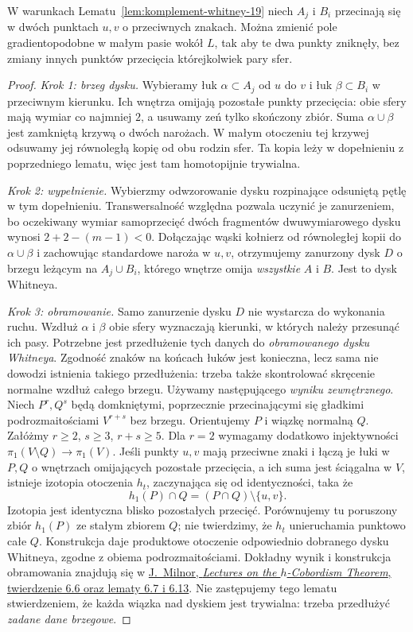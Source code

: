 \begin{lemat}
\label{lem:whitney-hc-19}
W warunkach
Lematu~\ref{lem:komplement-whitney-19}
niech $A_j$ i $B_i$
przecinają się w dwóch
punktach $u,v$ o przeciwnych
znakach. Można zmienić
pole gradientopodobne
w małym pasie wokół $L$,
tak aby te dwa punkty
zniknęły, bez zmiany innych
punktów przecięcia
którejkolwiek pary sfer.
\end{lemat}
\begin{proof}
\emph{Krok 1: brzeg dysku.}
Wybieramy łuk $\alpha\subset A_j$
od $u$ do $v$ i łuk
$\beta\subset B_i$ w przeciwnym
kierunku. Ich wnętrza
omijają pozostałe punkty
przecięcia: obie sfery mają
wymiar co najmniej $2$,
a usuwamy zeń tylko
skończony zbiór.
Suma $\alpha\cup\beta$
jest zamkniętą krzywą
o dwóch narożach.
W małym otoczeniu tej krzywej
odsuwamy jej równoległą
kopię od obu rodzin sfer.
Ta kopia leży w dopełnieniu
z poprzedniego lematu,
więc jest tam homotopijnie
trywialna.

\emph{Krok 2: wypełnienie.}
Wybierzmy odwzorowanie dysku
rozpinające odsuniętą pętlę
w tym dopełnieniu.
Transwersalność względna
pozwala uczynić je
zanurzeniem, bo oczekiwany
wymiar samoprzecięć
dwóch fragmentów
dwuwymiarowego dysku
wynosi $2+2-(m-1)<0$.
Dołączając wąski kołnierz
od równoległej kopii do
$\alpha\cup\beta$
i zachowując standardowe naroża w $u,v$,
otrzymujemy zanurzony
dysk $D$ o brzegu leżącym
na $A_j\cup B_i$,
którego wnętrze omija
\emph{wszystkie} $A$ i $B$.
Jest to dysk Whitneya.

\emph{Krok 3: obramowanie.}
Samo zanurzenie dysku $D$ nie
wystarcza do wykonania ruchu.
Wzdłuż $\alpha$ i $\beta$ obie sfery
wyznaczają kierunki, w których
należy przesunąć ich pasy. Potrzebne
jest przedłużenie tych danych do
\emph{obramowanego dysku Whitneya}.
Zgodność znaków na końcach łuków
jest konieczna, lecz sama nie
dowodzi istnienia takiego przedłużenia:
trzeba także skontrolować skręcenie
normalne wzdłuż całego brzegu.
Używamy następującego \emph{wyniku zewnętrznego}.
Niech $P^r,Q^s$ będą domkniętymi, poprzecznie przecinającymi się
gładkimi podrozmaitościami $V^{r+s}$ bez brzegu. Orientujemy $P$
i wiązkę normalną $Q$. Załóżmy $r\geq2$, $s\geq3$, $r+s\geq5$.
Dla $r=2$ wymagamy dodatkowo injektywności
$\pi_1(V\setminus Q)\to\pi_1(V)$.
Jeśli punkty $u,v$ mają przeciwne znaki i łączą je łuki w $P,Q$
o wnętrzach omijających pozostałe przecięcia, a ich suma jest
ściągalna w $V$, istnieje izotopia otoczenia $h_t$, zaczynająca się
od identyczności, taka że
\[
 h_1(P)\cap Q=(P\cap Q)\setminus\{u,v\}.
\]
Izotopia jest identyczna blisko pozostałych przecięć.
Porównujemy tu poruszony zbiór $h_1(P)$ ze stałym zbiorem $Q$;
nie twierdzimy, że $h_t$ unieruchamia punktowo całe $Q$.
Konstrukcja daje produktowe otoczenie odpowiednio
dobranego dysku Whitneya, zgodne z obiema podrozmaitościami.
Dokładny wynik i konstrukcja obramowania znajdują się w
\href{https://webhomes.maths.ed.ac.uk/~v1ranick/surgery/hcobord.pdf}
{J.\ Milnor, \emph{Lectures on the $h$-Cobordism Theorem},
twierdzenie 6.6 oraz lematy 6.7 i 6.13}.
Nie zastępujemy tego lematu stwierdzeniem, że każda wiązka nad
dyskiem jest trywialna: trzeba przedłużyć \emph{zadane dane brzegowe}.


\end{proof}
